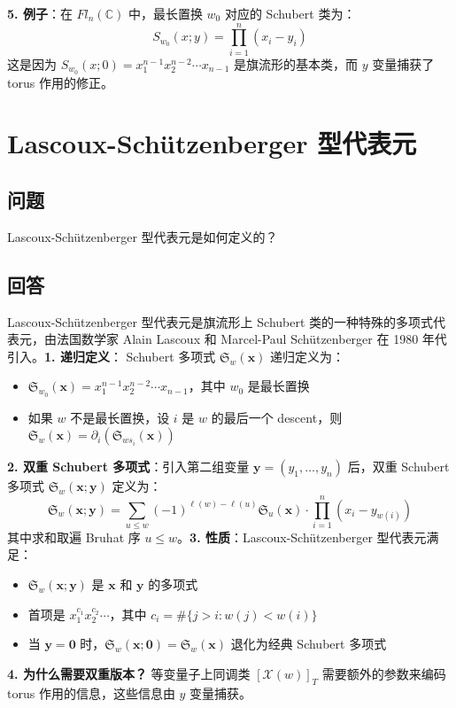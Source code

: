 \textbf{5. 例子}：在 $Fl_n(\mathbb{C})$ 中，最长置换 $w_0$ 对应的 Schubert 类为：$$S_{w_0}(x; y) = \prod_{i=1}^n (x_i - y_i)$$这是因为 $S_{w_0}(x; 0) = x_1^{n-1} x_2^{n-2} \cdots x_{n-1}$ 是旗流形的基本类，而 $y$ 变量捕获了 torus 作用的修正。
\section{Lascoux-Schützenberger 型代表元}\label{sec:LascouxSchutzenberger}
\subsection{问题}
Lascoux-Schützenberger 型代表元是如何定义的？
\subsection{回答}
Lascoux-Schützenberger 型代表元是旗流形上 Schubert 类的一种特殊的多项式代表元，由法国数学家 Alain Lascoux 和 Marcel-Paul Schützenberger 在 1980 年代引入。\textbf{1. 递归定义}： Schubert 多项式 $\mathfrak{S}_w(\mathbf{x})$ 递归定义为：
\begin{itemize}
\item $\mathfrak{S}_{w_0}(\mathbf{x}) = x_1^{n-1} x_2^{n-2} \cdots x_{n-1}$，其中 $w_0$ 是最长置换
\item 如果 $w$ 不是最长置换，设 $i$ 是 $w$ 的最后一个 descent，则 $\mathfrak{S}_w(\mathbf{x}) = \partial_i(\mathfrak{S}_{w s_i}(\mathbf{x}))$
\end{itemize}

\textbf{2. 双重 Schubert 多项式}：引入第二组变量 $\mathbf{y} = (y_1, \ldots, y_n)$ 后，双重 Schubert 多项式 $\mathfrak{S}_w(\mathbf{x}; \mathbf{y})$ 定义为：$$\mathfrak{S}_w(\mathbf{x}; \mathbf{y}) = \sum_{u \leq w} (-1)^{\ell(w)-\ell(u)} \mathfrak{S}_u(\mathbf{x}) \cdot \prod_{i=1}^n (x_i - y_{w(i)})$$其中求和取遍 Bruhat 序 $u \leq w$。\textbf{3. 性质}：Lascoux-Schützenberger 型代表元满足：
\begin{itemize}
\item $\mathfrak{S}_w(\mathbf{x}; \mathbf{y})$ 是 $\mathbf{x}$ 和 $\mathbf{y}$ 的多项式
\item 首项是 $x_1^{c_1} x_2^{c_2} \cdots$，其中 $c_i = \#\{j > i : w(j) < w(i)\}$
\item 当 $\mathbf{y} = \mathbf{0}$ 时，$\mathfrak{S}_w(\mathbf{x}; \mathbf{0}) = \mathfrak{S}_w(\mathbf{x})$ 退化为经典 Schubert 多项式
\end{itemize}

\textbf{4. 为什么需要双重版本？} 等变量子上同调类 $[\mathcal{X}(w)]_T$ 需要额外的参数来编码 torus 作用的信息，这些信息由 $y$ 变量捕获。
